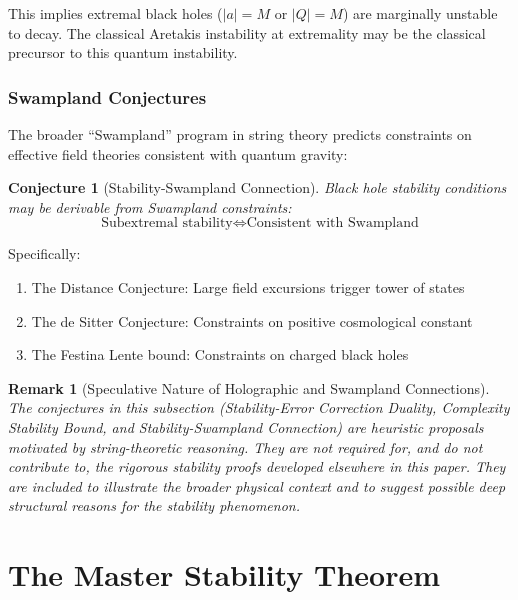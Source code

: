 \documentclass[12pt,a4paper]{article}
\newtheorem{remark}[theorem]{Remark}
\newtheorem{conjecture}[theorem]{Conjecture}
\begin{document}
This implies extremal black holes ($|a| = M$ or $|Q| = M$) are marginally unstable to decay. The classical Aretakis instability at extremality may be the classical precursor to this quantum instability.

\subsubsection{Swampland Conjectures}

The broader ``Swampland'' program in string theory predicts constraints on effective field theories consistent with quantum gravity:

\begin{conjecture}[Stability-Swampland Connection]
Black hole stability conditions may be derivable from Swampland constraints:
\begin{equation}
\text{Subextremal stability} \Leftrightarrow \text{Consistent with Swampland}
\end{equation}
\end{conjecture}

Specifically:
\begin{enumerate}
    \item The Distance Conjecture: Large field excursions trigger tower of states
    \item The de Sitter Conjecture: Constraints on positive cosmological constant
    \item The Festina Lente bound: Constraints on charged black holes
\end{enumerate}

\begin{remark}[Speculative Nature of Holographic and Swampland Connections]
The conjectures in this subsection (Stability-Error Correction Duality, Complexity Stability Bound, and Stability-Swampland Connection) are \emph{heuristic proposals} motivated by string-theoretic reasoning. They are not required for, and do not contribute to, the rigorous stability proofs developed elsewhere in this paper. They are included to illustrate the broader physical context and to suggest possible deep structural reasons for the stability phenomenon.
\end{remark}

\section{The Master Stability Theorem}
\end{document}
